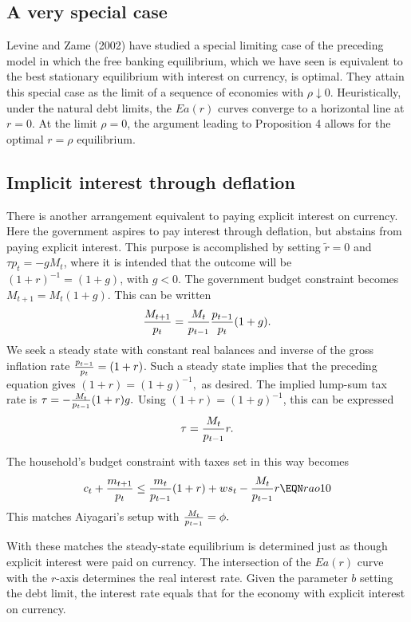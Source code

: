     
\subsection{A very special case}
  Levine and Zame (2002)
 have studied a special limiting case of the preceding model
in which  the free banking equilibrium, which we have seen is
equivalent to  the best stationary equilibrium with
interest on currency, is optimal.  They attain this
special case as the limit of a sequence of economies
with $\rho \downarrow 0$.  Heuristically, under the natural debt limits,
the  $Ea(r)$ curves converge to a horizontal line at $r =0$.
At the limit $\rho=0$, the argument leading to Proposition 4 allows
for the optimal $r=\rho$ equilibrium.

\subsection{Implicit interest through deflation}
There is another arrangement equivalent to paying explicit interest on
currency.  Here the government aspires to pay interest through deflation,
but abstains from paying explicit interest.  This purpose is accomplished
by setting $\tilde r=0$ and
 $ \tau p_t = - g M_t$, where it is intended that the outcome will be
$ (1+r)^{-1} = (1+g)$, with $g < 0$.  The government budget constraint
becomes
$ M_{t+1} = M_t(1+g)$.  This can be written
$$ {M_{t+1} \over p_t} = {M_t \over p_{t-1}} {p_{t-1} \over p_t} (1+g). $$
We seek a steady state with constant real balances and inverse of the
gross inflation rate ${p_{t-1} \over p_t} = (1+r)$.  Such a steady state
implies that the preceding equation gives
$ (1+r) = (1+g)^{-1},$  as desired.  The implied lump-sum tax rate is
$ \tau = - {M_t \over p_{t-1}} (1+r) g. $  Using
$(1+r)=(1+g)^{-1}$, this can be expressed
$$ \tau =  {M_t \over p_{t-1}} r. $$

  The household's budget constraint with taxes set in this way
becomes
$$ c_t + {m_{t+1} \over p_t} \leq {m_{t} \over p_{t-1}} (1+r)
      + w s_t - {M_t \over p_{t-1}} r  \EQN rao10$$
This matches Aiyagari's setup with
$ {M_t \over p_{t-1}} = \phi.$

   With these matches the steady-state equilibrium is determined
just as though explicit interest were paid on currency.   The intersection
of the $E a(r)$ curve with the $r$-axis determines the real interest
rate.  Given the parameter $b$ setting the debt limit, the interest
rate equals that for the economy with explicit interest on currency.


